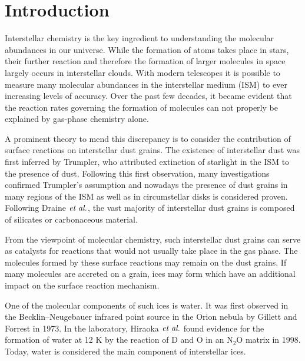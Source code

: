 \tableofcontents
\cleardoublepage



    \maketitle
\section{Introduction}
\label{Sec:Intro}
Interstellar chemistry is the key ingredient to understanding the
molecular abundances in our universe. While
the formation of atoms takes place in stars, %
their further reaction and therefore the formation of larger molecules in
space largely occurs in interstellar clouds. With modern telescopes it is
possible to measure many molecular abundances in the interstellar medium (ISM)
to ever increasing levels of accuracy. Over the past few decades, it became
evident that the reaction rates governing the formation of molecules can not
properly be explained by gas-phase chemistry
alone.\cite{DishoeckHerbstNeufeld2013}

A prominent theory to mend this discrepancy is to consider the
contribution of surface reactions on interstellar dust
grains.\cite{WilliamsHerbst2002} The existence of interstellar dust was first
inferred by Trumpler,\cite{Trumpler1930} who attributed extinction of starlight
in the ISM to the presence of dust. Following this first observation, many
investigations confirmed Trumpler's assumption and nowadays the presence of
dust grains in many regions of the ISM as well as in circumstellar disks is
considered proven.
\cite{Zook2001,WestphalStroudBechtelEtAl2014} Following Draine $\emph{et al.}$,
the vast majority of interstellar dust grains is composed of silicates or
carbonaceous material. \cite{Draine2003}

From the viewpoint of molecular chemistry, such interstellar dust grains can
serve as catalysts for reactions that would not usually take place in the
gas phase. The molecules formed by these surface reactions may remain on the
dust grains. If many molecules are accreted on a grain, ices may form which have
an additional impact on the surface reaction mechanism.

One of the molecular components of such ices is water. It was first observed
in the Becklin--Neugebauer infrared point source in the Orion
nebula by Gillett and Forrest in 1973.
\cite{BecklinNeugebauer1967,GillettForrest1973} In the laboratory, Hiraoka
$\emph{et al.}$ found evidence for the formation of water at 12 K by the reaction of D and O in an N$_2$O
matrix in 1998.\cite{Hiraoka1998} Today, water is considered the main component
of interstellar ices. \cite{BoogertGerakinesWhittet2015} 

